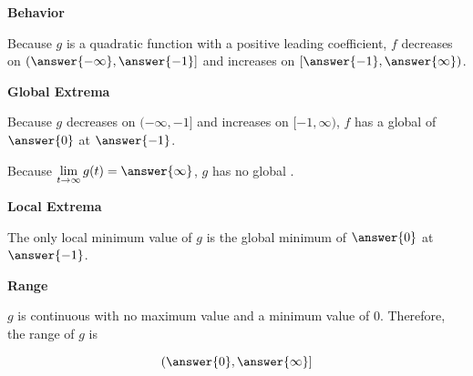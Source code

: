 \documentclass{ximera}
\begin{document}
\begin{exercise}
\begin{question}
\end{question}




\begin{question}  \textbf{\textcolor{blue!55!black}{Behavior}}



Because $g$ is a quadratic function with a positive leading coefficient, $f$ decreases on $\left( \answer{-\infty}, \answer{-1} \right]$ and increases on $\left[ \answer{-1}, \answer{\infty} \right)$. 

\end{question}









\begin{question}  \textbf{\textcolor{blue!55!black}{Global Extrema}}

Because $g$ decreases on $( -\infty, -1 ]$ and increases on $[ -1, \infty )$, $f$ has a global   of $\answer{0}$ at $\answer{-1}$.



Because $\lim\limits_{t \to \infty} g(t) = \answer{\infty}$, $g$ has no global .

\end{question}












\begin{question}  \textbf{\textcolor{blue!55!black}{Local Extrema}}

The only local minimum value of $g$ is the global minimum of $\answer{0}$ at $\answer{-1}$.

\end{question}







\begin{question}  \textbf{\textcolor{blue!55!black}{Range}}

$g$ is continuous with no maximum value and a minimum value of $0$.  Therefore, the range of $g$ is

\[
\left( \answer{0}, \answer{\infty} \right]
\]

\end{question}


\end{exercise}
\end{document}
